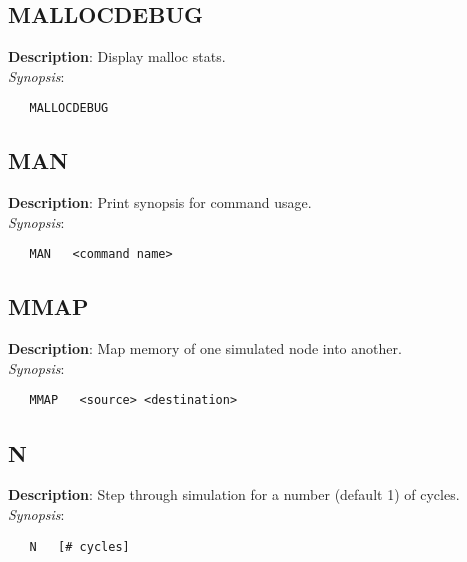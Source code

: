 \subsection{\bf MALLOCDEBUG}
\label{manpages:MALLOCDEBUG}
\label{manpages:mallocdebug}
\vspace{-0.2in}
{\bf Description}: 	Display malloc stats.\\[1.5ex]
{\em Synopsis}:
\vspace{-0.2in}
\scriptsize
\begin{verbatim}
   MALLOCDEBUG   						
\end{verbatim}
\normalsize
\vspace{-0.2in}


\subsection{\bf MAN}
\label{manpages:MAN}
\label{manpages:man}
\vspace{-0.2in}
{\bf Description}: 	Print synopsis for command usage.\\[1.5ex]
{\em Synopsis}:
\vspace{-0.2in}
\scriptsize
\begin{verbatim}
   MAN   <command name>			
\end{verbatim}
\normalsize
\vspace{-0.2in}


\subsection{\bf MMAP}
\label{manpages:MMAP}
\label{manpages:mmap}
\vspace{-0.2in}
{\bf Description}: 	Map memory of one simulated node into another.\\[1.5ex]
{\em Synopsis}:
\vspace{-0.2in}
\scriptsize
\begin{verbatim}
   MMAP   <source> <destination>	
\end{verbatim}
\normalsize
\vspace{-0.2in}


\subsection{\bf N}
\label{manpages:N}
\label{manpages:n}
\vspace{-0.2in}
{\bf Description}: 	Step through simulation for a number (default 1) of cycles.\\[1.5ex]
{\em Synopsis}:
\vspace{-0.2in}
\scriptsize
\begin{verbatim}
   N   [# cycles]	
\end{verbatim}
\normalsize
\vspace{-0.2in}


